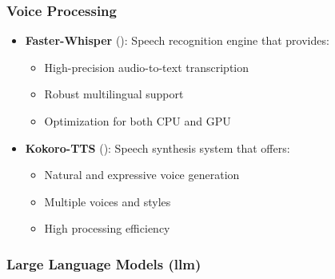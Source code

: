 \subsubsection{Voice Processing}
\begin{itemize}
	\item \textbf{Faster-Whisper} (\cite{peng2024owsmv31betterfaster}): Speech recognition engine that provides:
	      \begin{itemize}
		      \item High-precision audio-to-text transcription
		      \item Robust multilingual support
		      \item Optimization for both CPU and GPU
	      \end{itemize}

	\item \textbf{Kokoro-TTS} (\cite{hexgrad_2025}): Speech synthesis system that offers:
	      \begin{itemize}
		      \item Natural and expressive voice generation
		      \item Multiple voices and styles
		      \item High processing efficiency
	      \end{itemize}
\end{itemize}

\subsubsection{Large Language Models (\gls{llm})}

